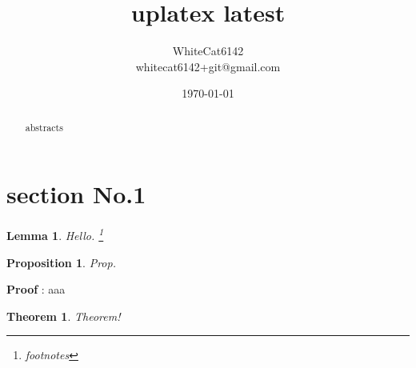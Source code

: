 \documentclass[uplatex,dvipdfmx,12pt,a4j]{jsarticle}
\newtheorem*{Lemma}{Lemma}
\newtheorem{Theorem}{Theorem}
\newtheorem{Proposition}{Proposition}
\begin{document}
\title{uplatex latest}
\author{WhiteCat6142 \\whitecat6142+git@gmail.com}
\date{\today}
\maketitle

\begin{abstract}
abstracts
\end{abstract}

\section{section No.1} 

\begin{Lemma}
Hello. \footnote{footnotes}
\end{Lemma}

\begin{Proposition}
Prop.
\end{Proposition}

\textbf{Proof}  :
 aaa

\begin{Theorem}
Theorem!
\end{Theorem}
\end{document}
